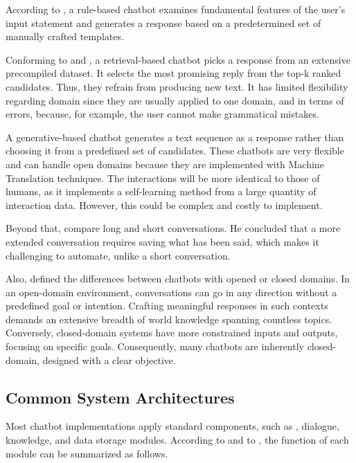 According to \citet{chizhik_challenges_2020}, a rule-based chatbot examines fundamental features of the user's input statement and generates a response based on a predetermined set of manually crafted templates.

Conforming to \citet{chizhik_challenges_2020} and \citet{borah_survey_2019}, a retrieval-based chatbot picks a response from an extensive precompiled dataset. It selects the most promising reply from the top-k ranked candidates. Thus, they refrain from producing new text. It has limited flexibility regarding domain since they are usually applied to one domain, and in terms of errors, because, for example, the user cannot make grammatical mistakes.

A generative-based chatbot generates a text sequence as a response rather than choosing it from a predefined set of candidates. These chatbots are very flexible and can handle open domains because they are implemented with Machine Translation techniques. The interactions will be more identical to those of humans, as it implements a self-learning method from a large quantity of interaction data. However, this could be complex and costly to implement.

Beyond that, \citet{borah_survey_2019} compare long and short conversations. He concluded that a more extended conversation requires saving what has been said, which makes it challenging to automate, unlike a short conversation. 

Also, \citet{borah_survey_2019} defined the differences between chatbots with opened or closed domains. In an open-domain environment, conversations can go in any direction without a predefined goal or intention. Crafting meaningful responses in such contexts demands an extensive breadth of world knowledge spanning countless topics. Conversely, closed-domain systems have more constrained inputs and outputs, focusing on specific goals. Consequently, many chatbots are inherently closed-domain, designed with a clear objective.


\subsection{Common System Architectures}

Most chatbot implementations apply standard components, such as {\nlp}, dialogue, knowledge, and data storage modules.
According to \citet{ngai_intelligent_2021} and to \citet{dilmegani_cem_how_nodate}, the function of each module can be summarized as follows.

